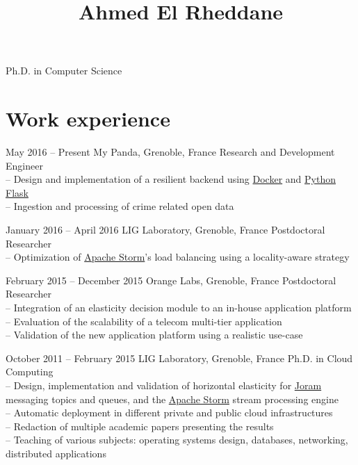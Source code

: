 \documentclass{mytccv}
\begin{document}
\title{Ahmed El Rheddane}{Ph.D. in Computer Science}

\section{Work experience}
\begin{eventlist}
\item{May 2016 -- Present}
     {My Panda, Grenoble, France}
     {Research and Development Engineer}\\
-- Design and implementation of a resilient backend using \href{https://www.docker.com/}{Docker} and \href{http://flask.pocoo.org/}{Python Flask}\medskip\\
-- Ingestion and processing of crime related open data

\vspace{\fill}

\item{January 2016 -- April 2016}
     {LIG Laboratory, Grenoble, France}
     {Postdoctoral Researcher}\\
-- Optimization of \href{https://storm.apache.org/}{Apache Storm}'s load balancing using a locality-aware strategy

\vspace{\fill}

\item{February 2015 -- December 2015}
     {Orange Labs, Grenoble, France}
     {Postdoctoral Researcher}\\
-- Integration of an elasticity decision module to an in-house application platform\medskip\\
-- Evaluation of the scalability of a telecom multi-tier application\medskip\\
-- Validation of the new application platform using a realistic use-case

\vspace{\fill}

\item{October 2011 -- February 2015}
     {LIG Laboratory, Grenoble, France}
     {Ph.D. in Cloud Computing}\\
-- Design, implementation and validation of horizontal elasticity for \href{http://joram.ow2.org/}{Joram} messaging topics and queues, and the \href{https://storm.apache.org/}{Apache Storm} stream processing engine\medskip\\
-- Automatic deployment in different private and public cloud infrastructures\medskip\\
-- Redaction of multiple academic papers presenting the results\medskip\\
-- Teaching of various subjects: operating systems design, databases, networking, distributed applications


\end{eventlist}
\end{document}
